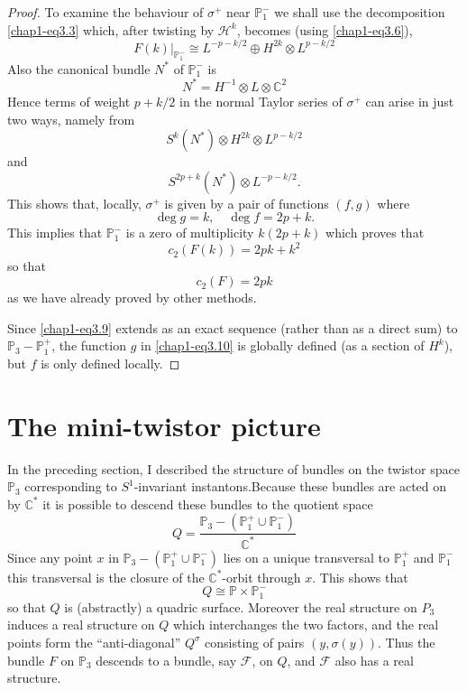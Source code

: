 \begin{proof}
To examine the behaviour of $\sigma^{+}$ near $\mathbb{P}^{-}_{1}$ we
shall use the decomposition \eqref{chap1-eq3.3} which, after twisting
by $\mathscr{H}^{k}$, becomes (using \eqref{chap1-eq3.6}), 
\begin{equation}
F(k)|_{\mathbb{P}^{-}_{1}}\cong L^{-p-k/2}\oplus H^{2k}\otimes
L^{p-k/2}\label{chap1-eq3.9} 
\end{equation}\pageoriginale
Also the canonical bundle $N^{*}$ of $\mathbb{P}^{-}_{1}$ is
$$
N^{*}=H^{-1}\otimes L\otimes\mathbb{C}^{2}
$$
Hence terms of weight $p+k/2$ in the normal Taylor series of
$\sigma^{+}$ can arise in just two ways, namely from
$$
S^{k}(N^{*})\otimes H^{2k}\otimes L^{p-k/2}
$$
and
$$
S^{2p+k}(N^{*})\otimes L^{-p-k/2}.
$$
This shows that, locally, $\sigma^{+}$ is given by a pair of functions
$(f,g)$ where
\begin{equation}
\deg g=k,\quad \deg f=2p+k.\label{chap1-eq3.10}
\end{equation}
This implies that $\mathbb{P}^{-}_{1}$ is a zero of multiplicity
$k(2p+k)$ which proves that
$$
c_{2}(F(k))=2pk+k^{2}
$$
so that
$$
c_{2}(F)=2pk
$$
as we have already proved by other methods.

Since \eqref{chap1-eq3.9} extends as an exact sequence (rather than as
a direct sum) to $\mathbb{P}_{3}-\mathbb{P}^{+}_{1}$, the function $g$
in \eqref{chap1-eq3.10} is globally defined (as a section of $H^{k}$),
but $f$ is only defined locally.
\end{proof}

\section{The mini-twistor picture}\label{chap1-sec4}

In the preceding section, I described the structure of bundles on the
twistor space $\mathbb{P}_{3}$ corresponding to $S^{1}$-invariant
instantons.\pageoriginale Because these bundles are acted on by
$\mathbb{C}^{*}$ it is possible to descend these bundles to the
quotient space
\begin{equation}
Q=\frac{\mathbb{P}_{3}-(\mathbb{P}^{+}_{1}\cup
  \mathbb{P}^{-}_{1})}{\mathbb{C}^{*}}\label{chap1-eq4.1} 
\end{equation}
Since any point $x$ in $\mathbb{P}_{3}-(\mathbb{P}^{+}_{1}\cup
\mathbb{P}^{-}_{1})$ lies on a unique transversal to
$\mathbb{P}^{+}_{1}$ and $\mathbb{P}^{-}_{1}$ this transversal is the
closure of the $\mathbb{C}^{*}$-orbit through $x$. This shows that
\begin{equation}
Q\cong \mathbb{P}\times \mathbb{P}^{-}_{1}\label{chap1-eq4.2}
\end{equation}
so that $Q$ is (abstractly) a quadric surface. Moreover the real
structure on $P_{3}$ induces a real structure on $Q$ which
interchanges the two factors, and the real points form the
``anti-diagonal'' $Q^{\sigma}$ consisting of pairs
$(y,\sigma(y))$. Thus the bundle $F$ on $\mathbb{P}_{3}$ descends to a
bundle, say $\mathscr{F}$, on $Q$, and $\mathscr{F}$ also has a real
structure. 

